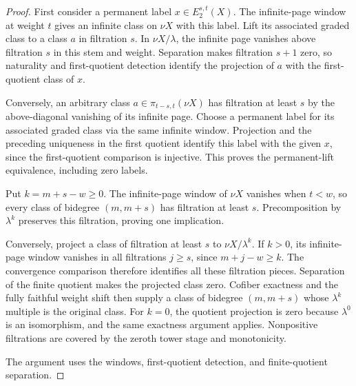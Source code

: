 \begin{proof}
First consider a permanent label $x\in E_2^{s,t}(X)$. The infinite-page
window at weight $t$ gives an infinite class on $\nu X$ with this
label. Lift its associated graded class to a class $a$ in filtration
$s$. In $\nu X/\lambda$, the infinite page vanishes above filtration
$s$ in this stem and weight. Separation makes filtration $s+1$ zero,
so naturality and first-quotient detection identify the projection
of $a$ with the first-quotient class of $x$.

Conversely, an arbitrary class $a\in\pi_{t-s,t}(\nu X)$ has
filtration at least $s$ by the above-diagonal vanishing of its infinite
page. Choose a permanent label for its associated graded class via
the same infinite window. Projection and the preceding uniqueness in
the first quotient identify this label with the given $x$, since the
first-quotient comparison is injective. This proves the
permanent-lift equivalence, including zero labels.

Put $k=m+s-w\ge0$. The infinite-page window of $\nu X$ vanishes when
$t<w$, so every class of bidegree $(m,m+s)$ has filtration at least
$s$. Precomposition by $\lambda^k$ preserves this filtration, proving
one implication.

Conversely, project a class of filtration at least $s$ to
$\nu X/\lambda^k$. If $k>0$, its infinite-page window vanishes in all
filtrations $j\ge s$, since $m+j-w\ge k$. The convergence comparison
therefore identifies all these filtration pieces. Separation of the
finite quotient makes the projected class zero. Cofiber exactness and
the fully faithful weight shift then supply a class of bidegree
$(m,m+s)$ whose $\lambda^k$ multiple is the original class. For $k=0$,
the quotient projection is zero because $\lambda^0$ is an isomorphism,
and the same exactness argument applies. Nonpositive filtrations are
covered by the zeroth tower stage and monotonicity.

The argument uses the windows, first-quotient detection, and
finite-quotient separation.
\end{proof}

